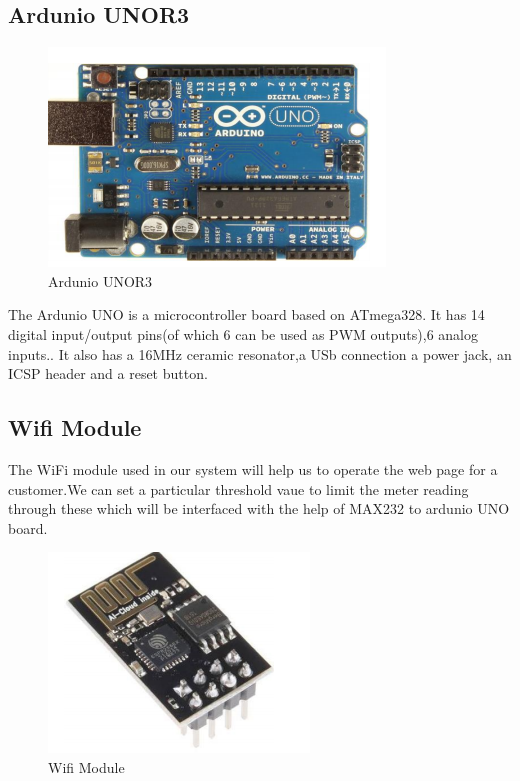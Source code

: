 \subsection{Ardunio UNOR3}

\begin{figure}
	\centering
	\includegraphics[width=0.7\linewidth]{picture-files/Arduino}
	\caption{Ardunio UNOR3}
	\label{fig:arduino}
\end{figure}

The Ardunio UNO is a microcontroller board
based on ATmega328. It has 14 digital
input/output pins(of which 6 can be used as
PWM outputs),6 analog inputs.\citep{Arduino}. It also has a 16MHz ceramic resonator,a USb connection
a power jack, an ICSP header and a reset
button.

\subsection{Wifi Module}

The WiFi module used in our system will help
us to operate the web page for a customer.We can set a particular threshold
vaue to limit the meter reading through these
which will be interfaced with the help of
MAX232 to ardunio UNO board.



\begin{figure}
	\centering
	\includegraphics[width=0.7\linewidth]{"picture-files/wifi module"}
	\caption[Wifi Module]{Wifi Module}
	\label{fig:wifi-module}
\end{figure}



